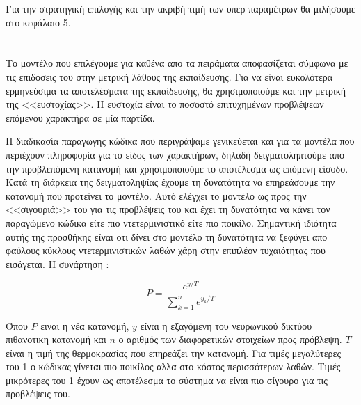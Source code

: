 Για την στρατηγική επιλογής και την ακριβή τιμή των υπερ-παραμέτρων θα μιλήσουμε στο κεφάλαιο 5.

\section{}

Το μοντέλο που επιλέγουμε για καθένα απο τα πειράματα αποφασίζεται σύμφωνα με τις επιδόσεις του στην μετρική λάθους της εκπαίδευσης.
Για να είναι ευκολότερα ερμηνεύσιμα τα αποτελέσματα της εκπαίδευσης, θα χρησιμοποιούμε και την μετρική της <<ευστοχίας>>.
Η ευστοχία είναι το ποσοστό επιτυχημένων προβλέψεων επόμενου χαρακτήρα σε μία παρτίδα.

Η διαδικασία παραγωγης κώδικα που περιγράψαμε γενικεύεται και για τα μοντέλα που περιέχουν πληροφορία για το είδος των χαρακτήρων, δηλαδή δειγματοληπτούμε από την προβλεπόμενη κατανομή και χρησιμοποιούμε το αποτέλεσμα ως επόμενη είσοδο.
Κατά τη διάρκεια της δειγματοληψίας έχουμε τη δυνατότητα να επηρεάσουμε την κατανομή που προτείνει το μοντέλο.
Αυτό ελέγχει το μοντέλο ως προς την <<σιγουριά>> του για τις προβλέψεις του και έχει τη δυνατότητα να κάνει τον παραγώμενο κώδικα είτε πιο ντετερμινιστικό είτε πιο ποικίλο.
Σημαντική ιδιότητα αυτής της προσθήκης είναι οτι δίνει στο μοντέλο τη δυνατότητα να ξεφύγει απο φαύλους κύκλους ντετερμινιστικών λαθών χάρη στην επιπλέον τυχαιότητας που εισάγεται.
Η συνάρτηση : 

\begin{equation}
P = \frac{e^{y/T}}{\sum_{k = 1}^{n} e^{y_k/T}}
\end{equation}

Όπου $P$ ειναι η νέα κατανομή, $y$ είναι η εξαγόμενη του νευρωνικού δικτύου πιθανοτικη κατανομή και $n$ ο αριθμός των διαφορετικών στοιχείων προς πρόβλεψη. $T$ είναι η τιμή της θερμοκρασίας που επηρεάζει την  κατανομή.
Για τιμές μεγαλύτερες του 1 ο κώδικας γίνεται πιο ποικίλος αλλα στο κόστος περισσότερων λαθών.
Τιμές μικρότερες του 1 έχουν ως αποτέλεσμα το σύστημα να είναι πιο σίγουρο για τις προβλέψεις του.

